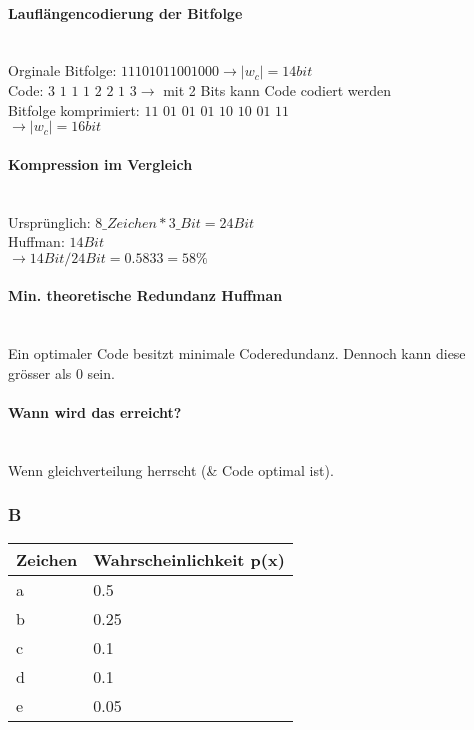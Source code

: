 \paragraph{Lauflängencodierung der Bitfolge}\mbox{}\\
Orginale Bitfolge: $11101011001000 \rightarrow |w_c| = 14 bit$\\
Code: $3$ $1$ $1$ $1$ $2$ $2$ $1$ $3 \rightarrow$ mit 2 Bits kann Code codiert werden\\
Bitfolge komprimiert: $11$ $01$ $01$ $01$ $10$ $10$ $01$ $11$\\
$\rightarrow |w_c| = 16 bit$

\paragraph{Kompression im Vergleich}\mbox{}\\
Ursprünglich: $8\_Zeichen * 3\_Bit = 24 Bit$\\
Huffman: $14 Bit$\\
$\rightarrow 14Bit/24Bit=0.5833=58\%$

\paragraph{Min. theoretische Redundanz Huffman}\mbox{}\\
Ein optimaler Code besitzt minimale Coderedundanz. Dennoch kann diese grösser als 0 sein.

\paragraph{Wann wird das erreicht?}\mbox{}\\
Wenn gleichverteilung herrscht (\& Code optimal ist).

\subsubsection{B}
\begin{center}
    \centering
    \begin{tabular}{l | l}
        \bfseries{Zeichen} & \bfseries{Wahrscheinlichkeit p(x)}\\ \hline
        a & 0.5\\ 
        b & 0.25\\
        c & 0.1\\
        d & 0.1\\
        e & 0.05
    \end{tabular}
\end{center}

